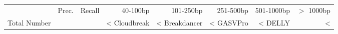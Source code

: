 \begin{table}[t]
\begin{center}
\begin{tabular}{rrr|rrrrr}
  \hline
                        & Prec. & Recall & 40-100bp  & 101-250bp  & 251-500bp & 501-1000bp & $>$ 1000bp \\ 
 Total Number &          &           & <%
  \hline
  Cloudbreak    &  <%
  Breakdancer   &  <%
  GASVPro        & <%
  DELLY           & <%

\end{tabular}
\end{center}
\end{table}
